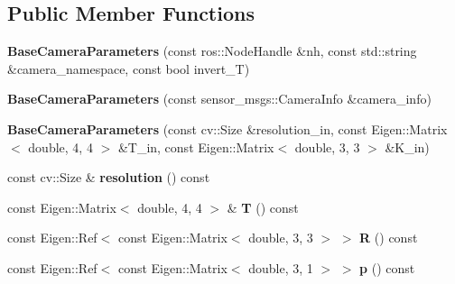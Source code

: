 \subsection*{Public Member Functions}
\begin{DoxyCompactItemize}
\item 
\mbox{\label{classimage__undistort_1_1BaseCameraParameters_a88a33425ade97a10aabdae322da2b72b}} 
{\bfseries Base\+Camera\+Parameters} (const ros\+::\+Node\+Handle \&nh, const std\+::string \&camera\+\_\+namespace, const bool invert\+\_\+T)
\item 
\mbox{\label{classimage__undistort_1_1BaseCameraParameters_a542e183ba91d54f0ec7f7e5aef5b41c4}} 
{\bfseries Base\+Camera\+Parameters} (const sensor\+\_\+msgs\+::\+Camera\+Info \&camera\+\_\+info)
\item 
\mbox{\label{classimage__undistort_1_1BaseCameraParameters_a1da0c8f547d638bd1ca788210fd60618}} 
{\bfseries Base\+Camera\+Parameters} (const cv\+::\+Size \&resolution\+\_\+in, const Eigen\+::\+Matrix$<$ double, 4, 4 $>$ \&T\+\_\+in, const Eigen\+::\+Matrix$<$ double, 3, 3 $>$ \&K\+\_\+in)
\item 
\mbox{\label{classimage__undistort_1_1BaseCameraParameters_a9697fe34201dbeedd04cc13050481888}} 
const cv\+::\+Size \& {\bfseries resolution} () const
\item 
\mbox{\label{classimage__undistort_1_1BaseCameraParameters_a319b23014e690f86f82e8c3c29d9b587}} 
const Eigen\+::\+Matrix$<$ double, 4, 4 $>$ \& {\bfseries T} () const
\item 
\mbox{\label{classimage__undistort_1_1BaseCameraParameters_a3f5a0a253d9db617fa9f83a6be317349}} 
const Eigen\+::\+Ref$<$ const Eigen\+::\+Matrix$<$ double, 3, 3 $>$ $>$ {\bfseries R} () const
\item 
\mbox{\label{classimage__undistort_1_1BaseCameraParameters_a922498c38ea5853135cfc2445171696d}} 
const Eigen\+::\+Ref$<$ const Eigen\+::\+Matrix$<$ double, 3, 1 $>$ $>$ {\bfseries p} () const

\end{DoxyCompactItemize}
